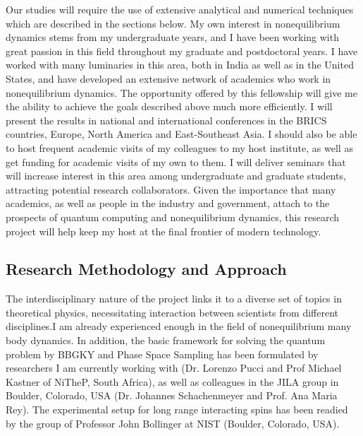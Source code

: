 \documentclass[a4paper,11pt,color]{article}
\begin{document}
Our studies will require the use of extensive analytical and numerical techniques which are described in the sections below. My own interest in nonequilibrium dynamics stems from my undergraduate years, and I have been working with great passion in this field throughout my graduate and postdoctoral years. I have worked with many luminaries in this area, both in India as well as in the United States, and have developed an extensive network of academics who work in nonequilibrium dynamics. The opportunity offered by this fellowship will give me the ability to achieve the goals described above much more efficiently. I will present the results in national and international conferences in the BRICS countries, Europe, North America and East-Southeast Asia. I should also be able to host frequent academic visits of my colleagues to my host institute, as well as get funding for academic visits of my own to them. I will deliver seminars that will increase interest in this area among undergraduate and graduate students, attracting potential research collaborators.  Given the importance that many academics, as well as people in the industry and government, attach to the prospects of quantum computing and nonequilibrium dynamics, this research project will help keep my host at the final frontier of modern technology.
 
\subsection{ Research Methodology and Approach}
\label{sec:research_methodology}

The interdisciplinary nature of the project links it to  a diverse set of topics in theoretical physics, necessitating interaction between scientists from different disciplines.I am already experienced enough in the field of nonequilibrium many body dynamics. In addition, the basic framework for solving the quantum problem by BBGKY and Phase Space Sampling has been formulated by researchers I am currently working with (Dr. Lorenzo Pucci and Prof Michael Kastner of NiTheP, South Africa), as well as colleagues in the JILA group in Boulder, Colorado, USA (Dr. Johannes Schachenmeyer and Prof. Ana Maria Rey). The experimental setup for long range interacting spins has been readied by the group of Professor John Bollinger at NIST (Boulder, Colorado, USA).
\end{document}
